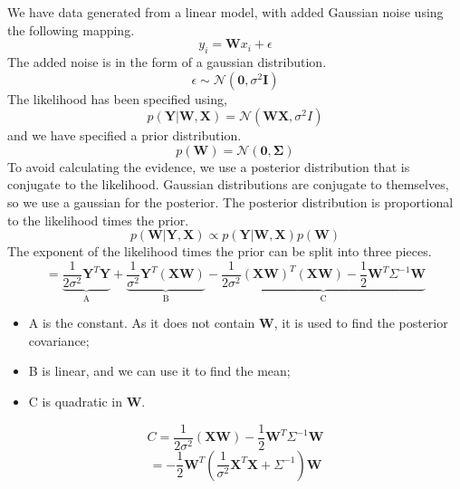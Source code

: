 \documentclass[10pt, a4paper, twocolumn]{article} %
\begin{document}
We have data generated from a linear model, with added Gaussian noise using the following mapping. 
\begin{equation*}
y_i = \mathbf{W}x_i + \epsilon
\end{equation*}
The added noise is in the form of a gaussian distribution.\\
\begin{equation*}
\epsilon \sim \mathcal{N}(\mathbf{0}, \sigma^2 \mathbf{I})
\end{equation*}
The likelihood has been specified using,
\begin{equation*}
p(\mathbf{Y}|\mathbf{W},\mathbf{X}) = \mathcal{N}(\mathbf{W} \mathbf{X}, \sigma^2I)
\end{equation*}
and we have specified a prior distribution. 
\begin{equation*}
p(\mathbf{W}) = \mathcal{N}(\mathbf{0}, \mathbf{\Sigma})
\end{equation*}
To avoid calculating the evidence, we use a posterior distribution that is conjugate to the likelihood. Gaussian distributions are conjugate to themselves, so we use a gaussian for the posterior. The posterior distribution is proportional to the likelihood times the prior. 
\begin{equation*}
p(\mathbf{W}|\mathbf{Y},\mathbf{X}) \propto p(\mathbf{Y}|\mathbf{W},\mathbf{X})p(\mathbf{W})
\end{equation*}
The exponent of the likelihood times the prior can be split into three pieces. 
\begin{equation}
= \underbrace{\frac{1}{2\sigma^2}\mathbf{Y}^{T}\mathbf{Y}}_\text{A} + \underbrace{\frac{1}{\sigma^{2}}\mathbf{Y}^{T}(\mathbf{XW})}_\text{B}-\underbrace{\frac{1}{2\sigma^2}(\mathbf{XW})^T(\mathbf{XW})-\frac{1}{2}\mathbf{W}^{T}\Sigma^{-1}\mathbf{W}}_\text{C}
\end{equation}
\begin{itemize}
\item A is the constant. As it does not contain $\mathbf{W}$, it is used to find the posterior covariance;
\item B is linear, and we can use it to find the mean;
\item C is quadratic in $\mathbf{W}$.
\end{itemize}
\begin{equation*}
C=\frac{1}{2\sigma^{2}}(\mathbf{XW})-\frac{1}{2}\mathbf{W}^{T}\Sigma^{-1}\mathbf{W}
\end{equation*}
\begin{equation*}
= -\frac{1}{2}\mathbf{W}^{T}(\frac{1}{\sigma^{2}}\mathbf{X}^{T}\mathbf{X} + \Sigma^{-1})\mathbf{W}
\end{equation*}
\end{document}

